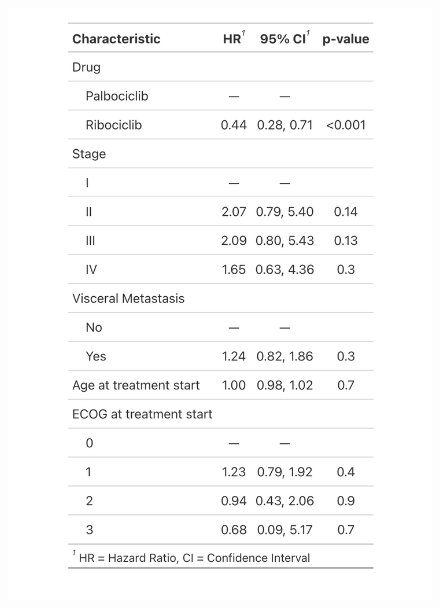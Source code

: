\begin{figure}[ht]
{    \includegraphics[width=\linewidth]{figures/table_cox_2.jpg.jpeg}%
  }
\end{figure}


